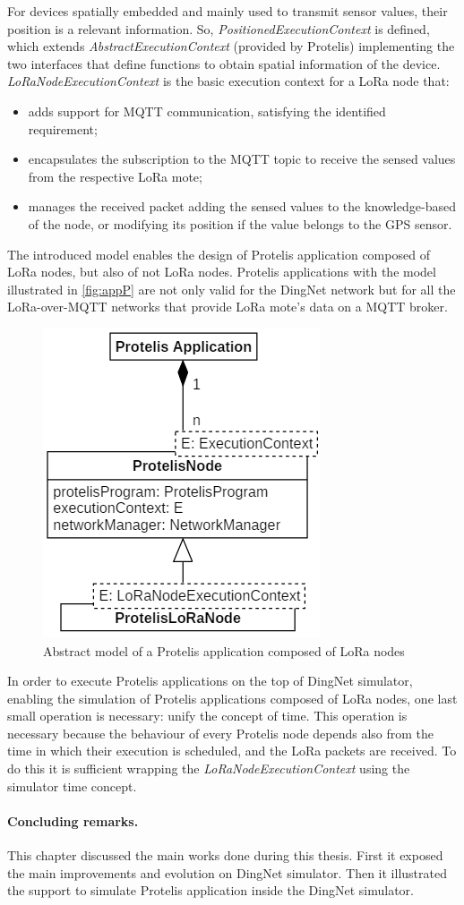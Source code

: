 \noindent For devices spatially embedded and mainly used to transmit sensor values, their position is a relevant information. So, \mbox{\textit{PositionedExecutionContext}} is defined, which extends \mbox{\textit{AbstractExecutionContext}} (provided by Protelis) implementing the two interfaces that define functions to obtain spatial information of the device.
\mbox{\textit{LoRaNodeExecutionContext}} is the basic execution context for a LoRa node that:
% 
\begin{itemize}
    \item adds support for MQTT communication, satisfying the identified requirement;
    \item encapsulates the subscription to the MQTT topic to receive the sensed values from the respective LoRa mote;
    \item manages the received packet adding the sensed values to the knowledge-based of the node, or modifying its position if the value belongs to the GPS sensor.
\end{itemize}
% 
The introduced model enables the design of Protelis application composed of LoRa nodes, but also of not LoRa nodes.
Protelis applications with the model illustrated in \autoref{fig:appP} are not only valid for the DingNet network but for all the LoRa-over-MQTT networks that provide LoRa mote's data on a MQTT broker.
% 
\begin{figure}[h]
    \centering
    \includegraphics{figures/app.png}
    \caption{Abstract model of a Protelis application composed of LoRa nodes}
    \label{fig:appP}
\end{figure}
% 
\noindent In order to execute Protelis applications on the top of DingNet simulator, enabling the simulation of Protelis applications composed of LoRa nodes, one last small operation is necessary: unify the concept of time. 
This operation is necessary because the behaviour of every Protelis node depends also from the time in which their execution is scheduled, and the LoRa packets are received.
To do this it is sufficient wrapping the \mbox{\textit{LoRaNodeExecutionContext}} using the simulator time concept.

\paragraph{Concluding remarks.} This chapter discussed the main works done during this thesis. First it exposed the main improvements and evolution on DingNet simulator. Then it illustrated the support to simulate Protelis application inside the DingNet simulator.